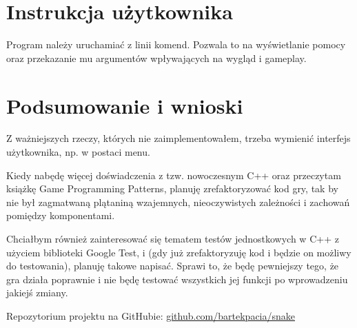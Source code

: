 \documentclass[12pt]{article}
\begin{document}
\section{Instrukcja użytkownika}
Program należy uruchamiać z linii komend. Pozwala to na wyświetlanie pomocy oraz
przekazanie mu argumentów wpływających na wygląd i gameplay.


\section{Podsumowanie i wnioski}

Z ważniejszych rzeczy, których nie zaimplementowałem, trzeba wymienić interfejs
użytkownika, np. w postaci menu.

Kiedy nabędę więcej doświadczenia z tzw. nowoczesnym C++ oraz przeczytam książkę
Game Programming Patterns, planuję zrefaktoryzować kod gry, tak by nie był
zagmatwaną plątaniną wzajemnych, nieoczywistych zależności i zachowań pomiędzy
komponentami.

Chciałbym również zainteresować się tematem testów jednostkowych w C++ z użyciem
biblioteki Google Test, i (gdy już zrefaktoryzuję kod i będzie on możliwy do
testowania), planuję takowe napisać. Sprawi to, że będę pewniejszy tego, że gra
działa poprawnie i nie będę testować wszystkich jej funkcji po wprowadzeniu
jakiejś zmiany.


Repozytorium projektu na GitHubie:
\href{https://github.com/bartekpacia/snake}{github.com/bartekpacia/snake}
\end{document}

